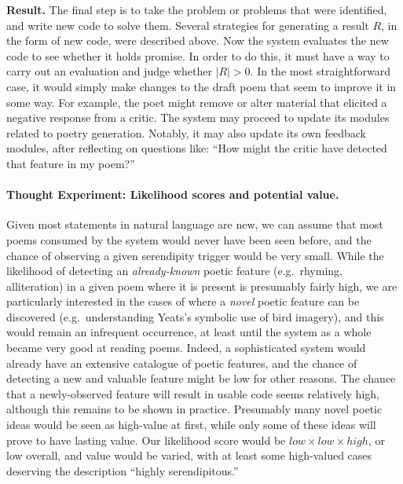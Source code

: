 


\noindent \textbf{Result.}
The final step is to take the problem or problems that were
identified, and write new code to solve them.  Several strategies for
generating a result $R$, in the form of new code, were described
above.  Now the system evaluates the new code to see whether it holds
promise.  In order to do this, it must have a way to carry out an
evaluation and judge whether $|R|>0$.  In the most straightforward
case, it would simply make changes to the draft poem that seem to
improve it in some way.  For example, the poet might remove or alter material that
elicited a negative response from a critic.  The system may proceed to
update its modules related to poetry generation.  Notably, it may also update its own
feedback modules, after reflecting on questions like: ``How might the
critic have detected that feature in my poem?''

\paragraph{Thought Experiment: Likelihood scores and potential value.}
Given most statements in natural language are new, we can assume that
most poems consumed by the system would never have been seen before,
and the chance of observing a given serendipity trigger would be very
small.  While the likelihood of detecting an \emph{already-known}
poetic feature (e.g.~rhyming, alliteration) in a given poem where it
is present is presumably fairly high, we are particularly interested
in the cases of where a \emph{novel} poetic feature can be discovered (e.g.~understanding Yeats's symbolic use of bird imagery), and this
would remain an infrequent occurrence, at least until the system as a
whole became very good at reading poems.  Indeed, a sophisticated
system would already have an extensive catalogue of poetic features,
and the chance of detecting a new and valuable feature might be low
for other reasons.  The chance that a newly-observed feature will
result in usable code seems relatively high, although this remains to
be shown in practice.  Presumably many novel poetic ideas would be seen as
high-value at first, while only some of these ideas will prove to have
lasting value.  Our likelihood score would be
$\mathit{low}\times\mathit{low}\times\mathit{high}$, or low overall,
and value would be varied, with at least some high-valued cases
deserving the description ``highly serendipitous.''\\


